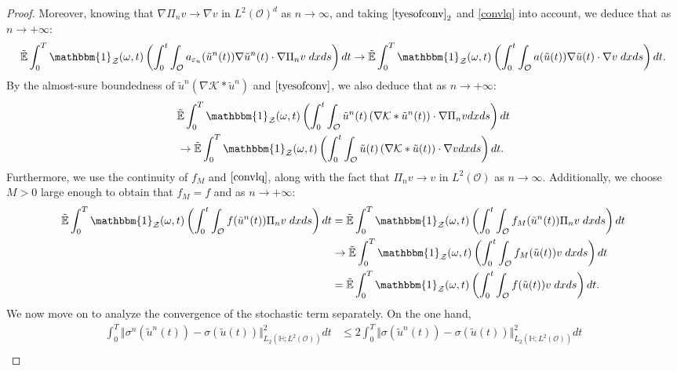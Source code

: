 \documentclass[10pt,number,preprint,times]{elsarticle}
\numberwithin{equation}{section} %
\begin{document}
\begin{proof}
\noindent
Moreover, knowing that $\nabla \Pi_n v \rightarrow \nabla v$  in $L^2(\mathcal{O})^d$ as $n \rightarrow \infty$, and taking $\eqref{tyesofconv}_2$ and \eqref{convlq} into account, we deduce that as $n \rightarrow +\infty$:
$$
\tilde{\mathbb{E}}\int_0^T \mathbbm{1}_{\mathcal{Z}}(\omega,t) \left(\int_{0}^t \int_{\mathcal{O}} a_{\varepsilon_n}(\tilde{u}^n(t))\nabla \tilde{u}^n(t) \cdot \nabla \Pi_n v\; dxds\right) dt \rightarrow \tilde{\mathbb{E}} \int_0^T \mathbbm{1}_{\mathcal{Z}}(\omega,t) \left(\int_{0}^t \int_{\mathcal{O}} a(\tilde{u}(t))\nabla \tilde{u}(t) \cdot \nabla  v\; dxds\right)dt.
$$
By the almost-sure boundedness of $\tilde{u}^n\left(\nabla \mathcal{K} \ast \tilde{u}^n\right)$ and $\eqref{tyesofconv}$, we also deduce that as $n \rightarrow +\infty$:
\begin{align*}
&\tilde{\mathbb{E}}  \int_0^T \mathbbm{1}_{\mathcal{Z}}(\omega,t) \left(\int_{0}^t \int_{\mathcal{O}} \tilde{u}^n(t)\left(\nabla \mathcal{K} \ast \tilde{u}^n(t)\right) \cdot \nabla \Pi_n v  dxds\right)dt\\ 
&\rightarrow  \tilde{\mathbb{E}}  \int_0^T \mathbbm{1}_{\mathcal{Z}}(\omega,t)\left(\int_{0}^t \int_{\mathcal{O}} \tilde{u}(t) \left(\nabla \mathcal{K} \ast \tilde{u}(t) \right) \cdot \nabla v dx ds\right)dt.
\end{align*}
Furthermore, we use the continuity of $f_M$ and $\eqref{convlq}$, along with the fact that $\Pi_n v \rightarrow v$  in $L^2(\mathcal{O})$ as $n \rightarrow \infty$. Additionally, we choose $M>0$ large enough to obtain that $f_M=f$ and as $n \rightarrow +\infty$:
\begin{align*}
\tilde{\mathbb{E}} \int_0^T \mathbbm{1}_{\mathcal{Z}}(\omega,t) \left( \int_{0}^t \int_{\mathcal{O}} f(\tilde{u}^n(t)) \Pi_n v\; dxds\right)dt&=\tilde{\mathbb{E}}  \int_0^T \mathbbm{1}_{\mathcal{Z}}(\omega,t) \left(\int_{0}^t \int_{\mathcal{O}} f_M(\tilde{u}^n(t)) \Pi_n v\; dxds\right)dt \\
&\rightarrow  \tilde{\mathbb{E}}  \int_0^T \mathbbm{1}_{\mathcal{Z}}(\omega,t) \left( \int_{0}^t \int_{\mathcal{O}} f_M(\tilde{u}(t)) v\; dxds \right)dt\\
&=\tilde{\mathbb{E}}  \int_0^T \mathbbm{1}_{\mathcal{Z}}(\omega,t) \left( \int_{0}^t \int_{\mathcal{O}} f(\tilde{u}(t)) v\; dxds\right)dt.
\end{align*}
We now move on to analyze the convergence of the stochastic term separately. On the one hand,  
\begin{align*}
	\int_{0}^T \Vert \sigma^n(\tilde{u}^n(t))-\sigma(\tilde{u}(t)) \Vert_{{L}_2(\mathbb{H} ;L^2(\mathcal{O}))}^2 dt &\leq  2	\int_{0}^T \Vert \sigma(\tilde{u}^n(t))-\sigma(\tilde{u}(t)) \Vert_{{L}_2(\mathbb{H} ;L^2(\mathcal{O}))}^2dt\\

\end{align*}
\end{proof}
\end{document}
